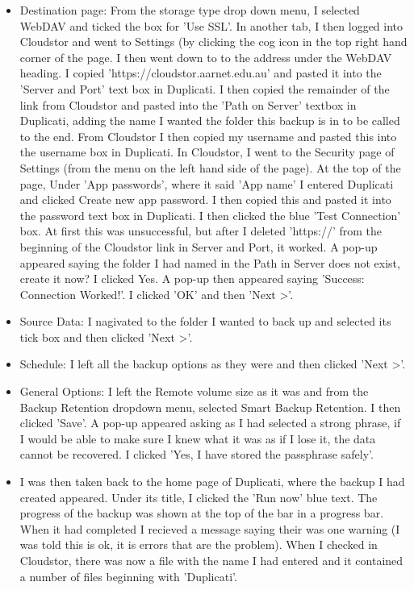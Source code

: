 \documentclass{article}
\begin{document}
\begin{FlushLeft}
\begin{itemize}
    \item Destination page: From the storage type drop down menu, I selected WebDAV and ticked the box for 'Use SSL'. In another tab, I then logged into Cloudstor and went to Settings (by clicking the cog icon in the top right hand corner of the page. I then went down to to the address under the WebDAV heading. I copied 'https://cloudstor.aarnet.edu.au' and pasted it into the 'Server and Port' text box in Duplicati. I then copied the remainder of the link from Cloudstor and pasted into the 'Path on Server' textbox in Duplicati, adding the name I wanted the folder this backup is in to be called to the end. From Cloudstor I then copied my username and pasted this into the username box in Duplicati. In Cloudstor, I went to the Security page of Settings (from the menu on the left hand side of the page). At the top of the page, Under 'App passwords', where it said 'App name' I entered Duplicati and clicked Create new app password. I then copied this and pasted it into the password text box in Duplicati. I then clicked the blue 'Test Connection' box. At first this was unsuccessful, but after I deleted 'https://' from the beginning of the Cloudstor link in Server and Port, it worked. A pop-up appeared saying the folder I had named in the Path in Server does not exist, create it now? I clicked Yes. A pop-up then appeared saying 'Success: Connection Worked!'. I clicked 'OK' and then 'Next \textgreater'.
    \item Source Data: I nagivated to the folder I wanted to back up and selected its tick box and then clicked 'Next \textgreater'.
    \item Schedule: I left all the backup options as they were and then clicked 'Next \textgreater'.
    \item General Options: I left the Remote volume size as it was and from the Backup Retention dropdown menu, selected Smart Backup Retention. I then clicked 'Save'. A pop-up appeared asking as I had selected a strong phrase, if I would be able to make sure I knew what it was as if I lose it, the data cannot be recovered. I clicked 'Yes, I have stored the passphrase safely'.
    \item I was then taken back to the home page of Duplicati, where the backup I had created appeared. Under its title, I clicked the 'Run now' blue text. The progress of the backup was shown at the top of the bar in a progress bar. When it had completed I recieved a message saying their was one warning (I was told this is ok, it is errors that are the problem). When I checked in Cloudstor, there was now a file with the name I had entered and it contained a number of files beginning with 'Duplicati'.

\end{itemize}
\end{FlushLeft}
\end{document}
